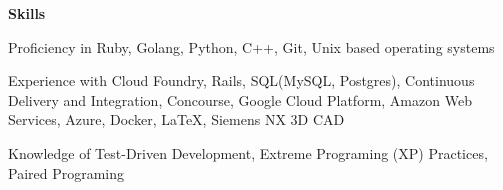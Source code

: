 \documentclass[10pt,a4papaer]{article}
\begin{document}
{	\setlength{\leftskip}{0pt}
	
	{\noindent\textbf{Skills}}\vspace*{-20px}\\
	
	\noindent\makebox[\linewidth]{\rule{\textwidth}{1.2pt}}
	
	Proficiency in Ruby, Golang, Python, C++, Git, Unix based operating systems\\
	
	\setlength{\leftskip}{15pt}
	
	{\noindent Experience with Cloud Foundry, Rails, SQL(MySQL, Postgres), Continuous Delivery and Integration, Concourse, Google Cloud Platform, Amazon Web Services, Azure, Docker, \LaTeX, Siemens NX 3D CAD}\\
	
	\setlength{\leftskip}{0pt}
	
	Knowledge of Test-Driven Development, Extreme Programing (XP) Practices, Paired Programing\\
	
}
\end{document}
